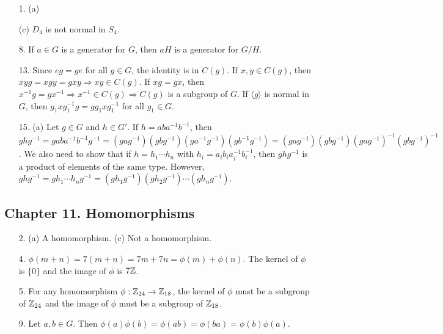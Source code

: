 {\small
\begin{itemize}
 
\item[1.]
(a)

(c) $D_4$ is not normal in $S_4$.
 
 


 
\item[8.]
If $a \in G$ is a generator for $G$, then $aH$ is a generator for $G/H$.
 
\item[13.]
Since $eg = ge$ for all $g \in G$, the identity is in $C(g)$. If $x,
y \in C(g)$, then $xy g = x g y = g xy \Rightarrow xy \in C(g)$.  If
$x g = g x$, then $x^{-1} g = g x^{-1} \Rightarrow x^{-1} \in C(g)
\Rightarrow C(g)$ is a subgroup of $G$. If $\langle g \rangle$ is
normal in $G$, then $g_1 x g_1^{-1} g = g g_1 x g_1^{-1}$ for all $g_1
\in G$.
 
\item[15.]
(a)
Let $g \in G$ and $h \in G'$. If $h = aba^{-1}b^{-1}$, then $ghg^{-1}
= gaba^{-1}b^{-1}g^{-1} 
= (gag^{-1})(gbg^{-1})(ga^{-1}g^{-1})(gb^{-1}g^{-1}) 
= (gag^{-1})(gbg^{-1})(gag^{-1})^{-1}(gbg^{-1})^{-1}$. We also need to
show that if $h = h_1 \cdots h_n$ with $h_i = a_i b_i a_i^{-1}
b_i^{-1}$, then $ghg^{-1}$ is a product of elements of the same type.
However, $ghg^{-1} = g h_1 \cdots h_n g^{-1} =
(gh_1g^{-1})(gh_2g^{-1}) \cdots (gh_ng^{-1})$.
 
 
 
 
\end{itemize}
}

\subsection*{Chapter 11. Homomorphisms}
 
{\small
\begin{itemize}
 

 
 
\item[2.]
(a) A homomorphism.
(c) Not a homomorphism.
 
 
\item[4.]
$\phi(m + n) = 7(m+n) = 7m + 7n = \phi(m) + \phi(n)$. The kernel of
$\phi$ is $\{ 0 \}$ and the image of $\phi$ is $7{\Bbb Z}$.
 
 
\item[5.]
For any homomorphism $\phi : {\Bbb Z}_{24} \rightarrow {\Bbb
Z}_{18}$, the kernel of $\phi$ must be a subgroup of ${\Bbb Z}_{24}$
and the image of $\phi$ must be a subgroup of ${\Bbb Z}_{18}$.
 
 
\item[9.]
Let $a, b \in G$. Then $\phi(a) \phi(b) = \phi(ab) = \phi(ba) =
\phi(b)\phi(a)$. 
 
 
 
 
\end{itemize}
}

